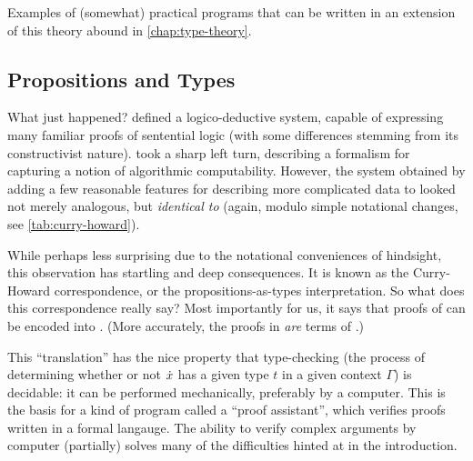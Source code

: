 \documentclass[./thesis.tex]{subfiles}
\begin{document}
Examples of (somewhat) practical programs that can be written in an extension
of this theory abound in \cref{chap:type-theory}.

\subsection{Propositions and Types}
\label{sec:propositions-and-types}

What just happened?  defined a logico-deductive system, capable of
expressing many familiar proofs of sentential logic (with some differences
stemming from its constructivist nature).  took a
sharp left turn, describing a formalism for capturing a notion of algorithmic
computability. However, the system obtained by adding a few reasonable features
for describing more complicated data to \STLC{} looked not merely
analogous, but \textit{identical to} \IPL{} (again, modulo simple
notational changes, see \cref{tab:curry-howard}).

While perhaps less surprising due to the notational conveniences of hindsight,
this observation has startling and deep consequences. It is known as the
Curry-Howard correspondence, or the propositions-as-types interpretation. So
what does this correspondence really say? Most importantly for us, it says that
proofs of \IPL{} can be encoded into \TLC{}. (More accurately, the proofs in
\IPL{} \textit{are} terms of \TLC{}.)

This ``translation'' has the nice property that type-checking (the process of
determining whether or not $\dot{x}$ has a given type $t$ in a given context
$Γ$) is decidable: it can be performed mechanically, preferably by a computer.
This is the basis for a kind of program called a ``proof assistant'', which
verifies proofs written in a formal langauge. The ability to verify complex
arguments by computer (partially) solves many of the difficulties hinted
at in the introduction.
\end{document}
